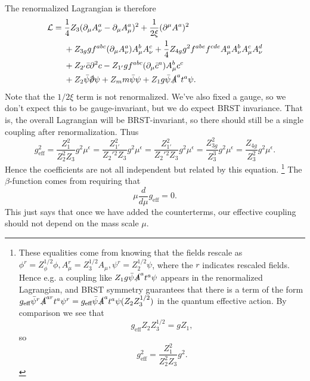 The renormalized Lagrangian is therefore
\begin{align*}
    \cL ={}& \frac{1}{4} Z_3 (\p_\mu A_\nu^a - \p_\mu A_\mu^a)^2 + \frac{1}{2\xi} (\p^\mu A^a)^2\\
    &+ Z_{3g} g f^{abc}(\p_\mu A_\nu^a) A_\mu^b A_\nu^c + \frac{1}{4} Z_{4g} g^2 f^{abe}f^{cde} A_\mu^a A_\nu^b A_\mu^c A_\nu^d\\
    &+ Z_{2'} \bar c \p^2 c - Z_{1'} g f^{abc} (\p_\mu \bar c^a) A_\mu^b c^c\\
    &+ Z_2 \bar \psi \slashed{\p} \psi +Z_m m \bar \psi \psi + Z_1 g \bar \psi \slashed{A}^a t^a \psi.
\end{align*}
Note that the $1/2\xi$ term is not renormalized. We've also fixed a gauge, so we don't expect this to be gauge-invariant, but we do expect BRST invariance. That is, the overall Lagrangian will be BRST-invariant, so there should still be a single coupling after renormalization.
Thus
\begin{equation}
    g^2_\text{eff} =\frac{Z_1^2}{Z_2^2 Z_3} g^2 \mu^\epsilon =\frac{Z_{1'}^2}{Z_2'{}^2 Z_3} g^2 \mu^\epsilon = \frac{Z_{1'}^2}{Z_2'{}^2 Z_3} g^2 \mu^\epsilon  =\frac{Z_{3g}^2}{Z_3^3} g^2 \mu^\epsilon = \frac{Z_{4g}}{Z_3^2} g^2 \mu^\epsilon.
\end{equation}
Hence the coefficients are not all independent but related by this equation.%
    \footnote{These equalities come from knowing that the fields rescale as $\phi^r = Z_\phi^{1/2} \phi, A_\mu^r = Z_3^{1/2}A_\mu, \psi^r = Z_2^{1/2}\psi$, where the $r$ indicates rescaled fields. Hence e.g. a coupling like $Z_1 g \bar \psi \slashed{A}^a t^a \psi$ appears in the renormalized Lagrangian, and BRST symmetry guarantees that there is a term of the form $g_\text{eff} \bar \psi^r \slashed{A}^{ar}t^a \psi^r=g_\text{eff} \bar \psi \slashed{A}^a t^a \psi (Z_2 Z_3^{1/2})$ in the quantum effective action. By comparison we see that
    \begin{equation*}
        g_\text{eff} Z_2 Z_3^{1/2} = g Z_1,
    \end{equation*}
    so
    \begin{equation*}
        g_\text{eff}^2 = \frac{Z_1^2}{Z_2^2 Z_3}g^2.
    \end{equation*}
    }
The $\beta$-function comes from requiring that
\begin{equation}
    \mu \frac{d}{d\mu} g_\text{eff}=0.
\end{equation}
This just says that once we have added the counterterms, our effective coupling should not depend on the mass scale $\mu$.

